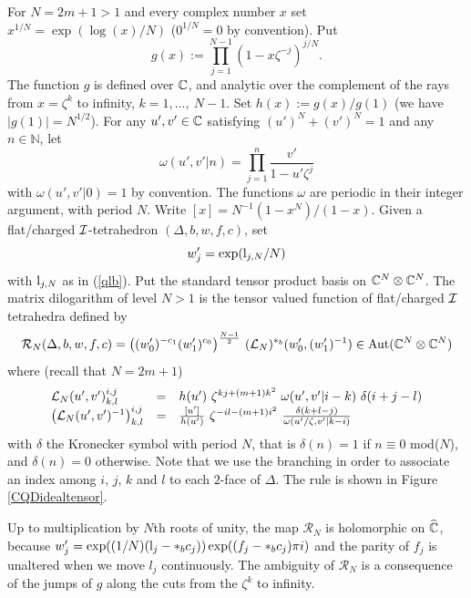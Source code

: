 For $N=2m+1>1$ and every complex number $x$ set $x^{1/N} =
\exp(\log(x)/N)$ ($0^{1/N} = 0$ by convention). Put
\begin{equation}\label{funcg}
g(x) := \prod_{j=1}^{N-1}(1 - x\zeta^{-j})^{j/N}.
\end{equation}
The function $g$ is defined over $\mathbb{C}$, and analytic over the
complement of the rays from $x =\zeta^k$ to infinity, $k=1,\ldots,\
N-1$. Set $h(x) := g(x)/g(1)$ (we have $\vert g(1) \vert = N^{1/2}$).
For any $u',v'\in {\mathbb C}$ satisfying $(u')^N + (v')^N = 1$ and any $ n \in
\mathbb{N}$, let
$$\omega(u',v'\vert n) = \prod_{j=1}^n \frac{v'}{1-u'\zeta^j}$$ with
$\omega(u',v'\vert 0) = 1$ by convention. The functions $\omega$ are
periodic in their integer argument, with period $N$. Write
$[x]=N^{-1}(1-x^N)/(1-x)$. Given a flat/charged ${\mathcal I}$-tetrahedron
$(\Delta,b,w,f,c)$, set
\begin{equation}\label{qvar}
w_j'=\exp({\rm l}_{j,N}/N)
\end{equation}
with ${\rm l}_{j,N}$ as in (\ref{qlb}). Put the standard tensor
product basis on ${\mathbb C}^N\otimes {\mathbb C}^N$. The matrix dilogarithm of level
$N>1$ is the tensor valued function of flat/charged ${\mathcal I}$ tetrahedra
defined by
\begin{equation}\label{symqmatdil}
\mathcal{R}_N(\Delta,b,w,f,c) =
\bigl((w_0')^{-c_1}(w_1')^{c_0}\bigr)^{\frac{N-1}{2}}\
({\mathcal L}_N)^{*_b}(w_0',(w_1')^{-1})\in {\rm
Aut}({\mathbb C}^N\otimes{\mathbb C}^N)
\end{equation}
where (recall that $N=2m+1$)
$$\begin{array}{lll} {\mathcal L}_N(u',v')_{k,l}^{i,j}& = & h(u')\
\zeta^{kj+(m+1)k^2}\ \omega(u',v'\vert i-k) \ \delta(i + j - l) \\
\bigl( {\mathcal L}_N(u',v')^{-1}\bigr)_{k,l}^{i,j}& = & \frac{[u']}{h(u')}\
\zeta^{-il-(m+1)i^2}\ \frac{\delta(k + l - j)}{\omega(u'/\zeta,v'\vert
k-i)}
\end{array}$$
with $\delta$ the Kronecker symbol with period $N$, that is $\delta(n)
= 1$ if $n \equiv 0$ mod($N$), and $\delta(n) = 0$ otherwise. Note
that we use the branching in order to associate an index among $i$,
$j$, $k$ and $l$ to each $2$-face of $\Delta$. The rule is shown in
Figure \ref{CQDidealtensor}.

Up to multiplication by $N$th roots of unity, the map $\mathcal{R}_N$
is holomorphic on $\widehat{\mathbb{C}}$, because $w_j'= \exp((1/N) ({\rm
  l}_j - *_bc_j)) \exp((f_j - *_bc_j)\pi i)$ and the parity of $f_j$
is unaltered when we move $l_j$ continuously. The ambiguity of
$\mathcal{R}_N$ is a consequence of the jumps of $g$ along the cuts
from the $\zeta^k$ to infinity.
\medskip

